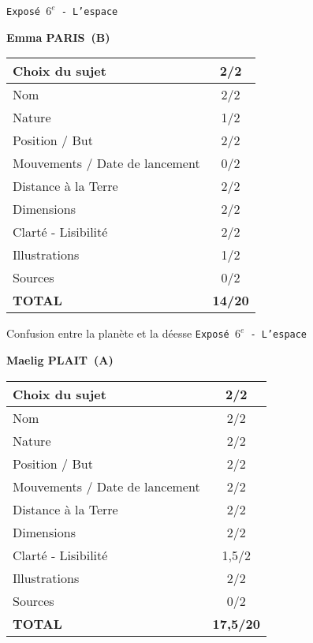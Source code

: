 	\vspace*{1cm}
	
	\newpage
	\LARGE{\texttt{Expos\'e $6^e$ - L'espace}}
	\vspace*{1cm}

	\textbf{Emma PARIS\ (B)}

	\vspace*{1.5cm}
	\begin{tabular}{|l|c|}
		\hline
		Choix du sujet & 2/2 \\
		\hline
		Nom & 2/2 \\
		\hline
		Nature & 1/2 \\
		\hline
		Position / But & 2/2 \\
		\hline
		Mouvements / Date de lancement & 0/2 \\
		\hline
		Distance \`a la Terre & 2/2 \\
		\hline
		Dimensions & 2/2 \\
		\hline
		Clart\'e - Lisibilit\'e & 2/2 \\
		\hline
		Illustrations & 1/2 \\
		\hline
		Sources & 0/2 \\
		\hline
		\textbf{TOTAL}  & \textbf{14/20} \\
		\hline
	\end{tabular}

	\vspace*{1cm}
	Confusion entre la plan\`ete et la d\'eesse
	\newpage
	\LARGE{\texttt{Expos\'e $6^e$ - L'espace}}
	\vspace*{1cm}

	\textbf{Maelig PLAIT\ (A)}

	\vspace*{1.5cm}
	\begin{tabular}{|l|c|}
		\hline
		Choix du sujet & 2/2 \\
		\hline
		Nom & 2/2 \\
		\hline
		Nature & 2/2 \\
		\hline
		Position / But & 2/2 \\
		\hline
		Mouvements / Date de lancement & 2/2 \\
		\hline
		Distance \`a la Terre & 2/2 \\
		\hline
		Dimensions & 2/2 \\
		\hline
		Clart\'e - Lisibilit\'e & 1,5/2 \\
		\hline
		Illustrations & 2/2 \\
		\hline
		Sources & 0/2 \\
		\hline
		\textbf{TOTAL}  & \textbf{17,5/20} \\
		\hline
	\end{tabular}

